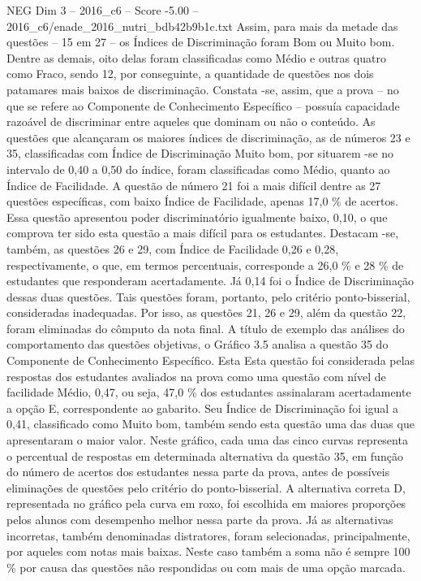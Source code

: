 \begin{textsample}{NEG Dim 3 – 2016\_c6 – Score -5.00 – 2016\_c6/enade\_2016\_nutri\_bdb42b9b1c.txt}
Assim, para mais da metade das questões – 15 em 27 – os Índices de Discriminação foram Bom ou Muito bom.
Dentre as demais, oito delas foram classificadas como Médio e outras quatro como Fraco, sendo 12, por conseguinte, a quantidade de questões nos dois patamares mais baixos de discriminação.
Constata -se, assim, que a prova – no que se refere ao Componente de Conhecimento Específico – possuía capacidade razoável de discriminar entre aqueles que dominam ou não o conteúdo.
As questões que alcançaram os maiores índices de discriminação, as de números 23 e 35, classificadas com Índice de Discriminação Muito bom, por situarem -se no intervalo de 0,40 a 0,50 do índice, foram classificadas como Médio, quanto ao Índice de Facilidade.
A questão de número 21 foi a mais difícil dentre as 27 questões específicas, com baixo Índice de Facilidade, apenas 17,0 \% de acertos.
Essa questão apresentou poder discriminatório igualmente baixo, 0,10, o que comprova ter sido esta questão a mais difícil para os estudantes.
Destacam -se, também, as questões 26 e 29, com Índice de Facilidade 0,26 e 0,28, respectivamente, o que, em termos percentuais, corresponde a 26,0 \% e 28 \% de estudantes que responderam acertadamente.
Já 0,14 foi o Índice de Discriminação dessas duas questões.
Tais questões foram, portanto, pelo critério ponto-bisserial, consideradas inadequadas.
Por isso, as questões 21, 26 e 29, além da questão 22, foram eliminadas do cômputo da nota final.
A título de exemplo das análises do comportamento das questões objetivas, o Gráfico 3.5 analisa a questão 35 do Componente de Conhecimento Específico.
Esta Esta questão foi considerada pelas respostas dos estudantes avaliados na prova como uma questão com nível de facilidade Médio, 0,47, ou seja, 47,0 \% dos estudantes assinalaram acertadamente a opção E, correspondente ao gabarito.
Seu Índice de Discriminação foi igual a 0,41, classificado como Muito bom, também sendo esta questão uma das duas que apresentaram o maior valor.
Neste gráfico, cada uma das cinco curvas representa o percentual de respostas em determinada alternativa da questão 35, em função do número de acertos dos estudantes nessa parte da prova, antes de possíveis eliminações de questões pelo critério do ponto-bisserial.
A alternativa correta D, representada no gráfico pela curva em roxo, foi escolhida em maiores proporções pelos alunos com desempenho melhor nessa parte da prova.
Já as alternativas incorretas, também denominadas distratores, foram selecionadas, principalmente, por aqueles com notas mais baixas.
Neste caso também a soma não é sempre 100 \% por causa das questões não respondidas ou com mais de uma opção marcada.

\end{textsample}
